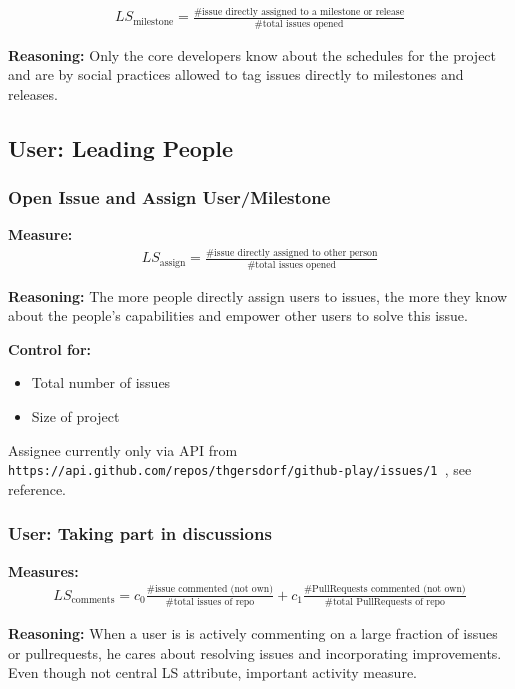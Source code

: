 \documentclass[a4paper,10pt]{article}
\begin{document}
\begin{align}
 LS_{\text{milestone}} = \frac{\text{\# issue directly assigned to a milestone or release}}{\text{\# total issues opened}} 
\end{align}

\textbf{Reasoning:}
Only the core developers know about the schedules for the project and are by social practices allowed to tag issues directly to milestones and releases.




\subsection{User: Leading People}
\subsubsection{Open Issue and Assign  User/Milestone}

\textbf{Measure:}
\begin{align}
 LS_{\text{assign}} = \frac{\text{\# issue directly assigned to other person}}{\text{\# total issues opened}} 
\end{align}


\textbf{Reasoning:}
The more people directly assign users to issues, the more they know about the people's capabilities and empower other users to solve this issue.



\textbf{Control for:}
\begin{itemize}
 \item Total number of issues
\item Size of project
\end{itemize}



Assignee currently only via API from \texttt{ https://api.github.com/repos/thgersdorf/github-play/issues/1
}, see reference.


\subsubsection{User: Taking part in discussions}
\textbf{Measures:}
\begin{align}
 LS_{\text{comments}} = c_{0}\frac{\text{\# issue commented (not own)}}{\text{\# total issues of repo}} +c_{1}\frac{\text{\# PullRequests commented (not own)}}{\text{\# total PullRequests of repo}} 
\end{align}

\textbf{Reasoning:} When a user is is actively commenting on a large fraction of issues or pullrequests, he cares about resolving issues and incorporating improvements. Even though not central LS attribute, important activity measure.
\end{document}
